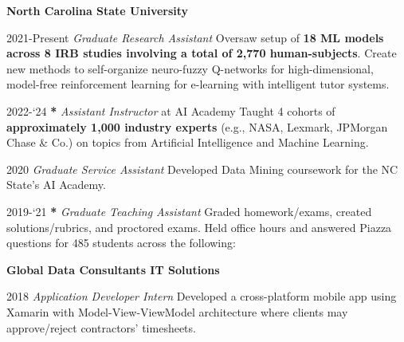 

\vspace{-4pt}\textbf{North Carolina State University}\vspace{-4pt}
\begin{cvskills}
  \cvskill
    {2021-Present} %
    {\textit{Graduate Research Assistant}} %
    {Oversaw setup of \textbf{18 ML models across 8 IRB studies involving a total of 2,770 human-subjects}. Create new methods to self-organize neuro-fuzzy Q-networks for high-dimensional, model-free reinforcement learning for e-learning with intelligent tutor systems.}

  \cvskill
    {2022-`24} %
    {\textbf{{\large {*}}} \textit{Assistant Instructor} at AI Academy} %
    {Taught 4 cohorts of \textbf{approximately 1,000 industry experts} (e.g., NASA, Lexmark, JPMorgan Chase \& Co.) on topics from Artificial Intelligence and Machine Learning.}

  \cvskill
    {2020} %
    {\textit{Graduate Service Assistant}} %
    {Developed Data Mining coursework for the NC State's AI Academy.}

  \cvskill
    {2019-`21} %
    {\textbf{{\large {*}}} \textit{Graduate Teaching Assistant}} %
    {Graded homework/exams, created solutions/rubrics, and proctored exams. Held office hours and answered Piazza questions for 485 students across the following:}
\end{cvskills}

\vspace{-8pt}
 
\vspace{-4pt}\textbf{Global Data Consultants IT Solutions}\vspace{-4pt}
\begin{cvskills}
  \cvskill
    {2018} %
    {\textit{Application Developer Intern}} %
    {Developed a cross-platform mobile app using Xamarin with Model-View-ViewModel architecture where clients may approve/reject contractors' timesheets.}

\end{cvskills}
